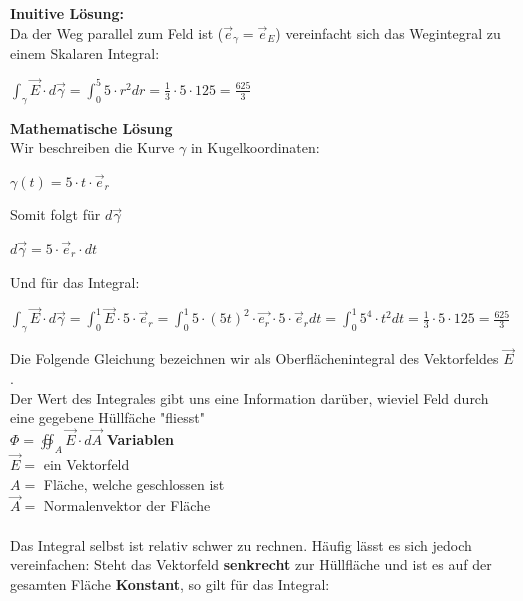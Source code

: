 \iend


\vspace \vfill
{}
\beginbsp
\textbf{Inuitive Lösung:} \\
Da der Weg parallel zum Feld ist ($\vec{e}_\gamma = \vec{e}_E$) vereinfacht sich das Wegintegral zu einem Skalaren Integral:
\begin{center}
	$\displaystyle \int_\gamma \vec{E}\cdot d\vec{\gamma} = \int_0^5 5 \cdot r^2 dr = \frac{1}{3} \cdot 5 \cdot 125 = \frac{625}{3}$
\end{center}
\textbf{Mathematische Lösung} \\
Wir beschreiben die Kurve $\gamma$ in Kugelkoordinaten:
\begin{center}
	$\gamma(t) = 5 \cdot t \cdot \vec{e}_r$
\end{center}
Somit folgt für $d \vec{\gamma}$
\begin{center}
	$d \vec{\gamma} = 5\cdot \vec{e}_r \cdot dt$
\end{center}
Und für das Integral:
\begin{center}

	$\displaystyle \int_\gamma \vec{E}\cdot d\vec{\gamma} =\int_0^1 \vec{E} \cdot 5 \cdot \vec{e}_r =  \int_0^1 5 \cdot (5t)^2 \cdot \vec{e_r} \cdot 5 \cdot \vec{e}_r dt =  \int_0^1 5^4 \cdot t^2 dt = \frac{1}{3} \cdot 5 \cdot 125 = \frac{625}{3}$
\end{center}
\iend

\newpage

\begingl
Die Folgende Gleichung bezeichnen wir als Oberflächenintegral des Vektorfeldes $\vec{E}$. \\
 Der Wert des Integrales gibt uns eine Information darüber, wieviel Feld durch eine gegebene Hüllfäche "fliesst" \\

\formulaBegin
$ \displaystyle \Phi = \oiint_A \vec{E} \cdot d\vec{A}$
\formulaEnd
\textbf{Variablen} \\
$\vec{E} =$ ein Vektorfeld\\
$A = $ Fläche, welche geschlossen ist\\
$\vec{A} =$ Normalenvektor der Fläche \\
\\

Das Integral selbst ist relativ schwer zu rechnen. Häufig lässt es sich jedoch vereinfachen:
Steht das Vektorfeld \textbf{senkrecht} zur Hüllfläche und ist es auf der gesamten Fläche \textbf{Konstant}, so gilt für das Integral: \\

